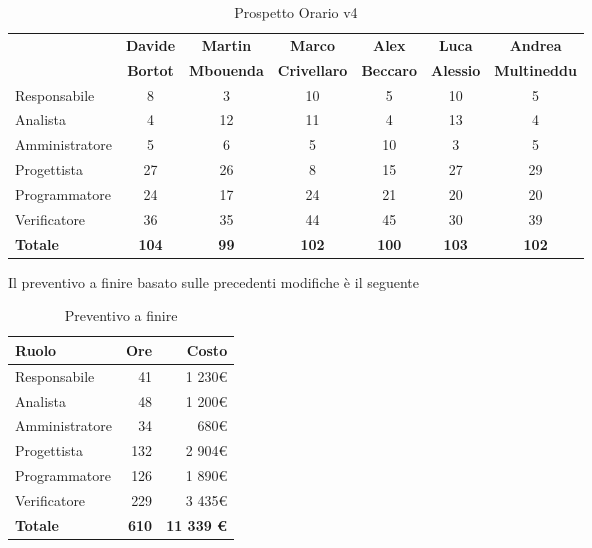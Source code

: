 \documentclass[a4paper,11pt]{article}
\begin{document}
		\begin{table}[h!]
		\hspace{0.2cm}\begin{tabular}{l c c c c c c}
& \textbf{Davide} & \textbf{Martin}   & \textbf{Marco} 		& \textbf{Alex}    & \textbf{Luca}    & \textbf{Andrea}\\
& \textbf{Bortot} & \textbf{Mbouenda} & \textbf{Crivellaro} & \textbf{Beccaro} & \textbf{Alessio} &\textbf{Multineddu}\\
			\midrule
			Responsabile 	& 8 	& 3  	& 10 	& 5 	& 10 	& 5 \\
			Analista 		& 4  	& 12  	& 11  	& 4 	& 13  	& 4 \\
			Amministratore 	& 5  	& 6 	& 5   	& 10 	& 3  	& 5	\\
			Progettista 	& 27 	& 26 	& 8  	& 15 	& 27 	& 29	\\
			Programmatore 	& 24 	& 17 	& 24  	& 21 	& 20 	& 20\\
			Verificatore 	& 36 	& 35 	& 44  	& 45 	& 30 	& 39\\
			\midrule
			\textbf{Totale} & \textbf{104} & \textbf{99} & \textbf{102} & \textbf{100} & \textbf{103} & \textbf{102}
		\end{tabular}
	\caption{Prospetto Orario v4}
	\end{table}	
	\clearpage	
	
		Il preventivo a finire basato sulle precedenti modifiche è il seguente
		
		\begin{table}[h!]
		\begin{center}
			\begin{tabular}{l r r}
			\textbf{Ruolo} 		& \textbf{Ore} 	& \textbf{Costo}\\
			\midrule
				Responsabile 	& 41 			& 1 230\euro		\\
				Analista 		& 48 			& 1 200\euro 	\\
				Amministratore 	& 34 			& 680\euro		\\
				Progettista 	& 132 			& 2 904\euro 	\\
				Programmatore 	& 126 			& 1 890\euro		\\
				Verificatore 	& 229 			& 3 435\euro		\\
			\midrule
			\textbf{Totale} 	& \textbf{610} 	& \textbf{ 11 339 \euro}
			\end{tabular}
		\end{center}
			\caption{Preventivo a finire}
		\end{table}
		
\end{document}
